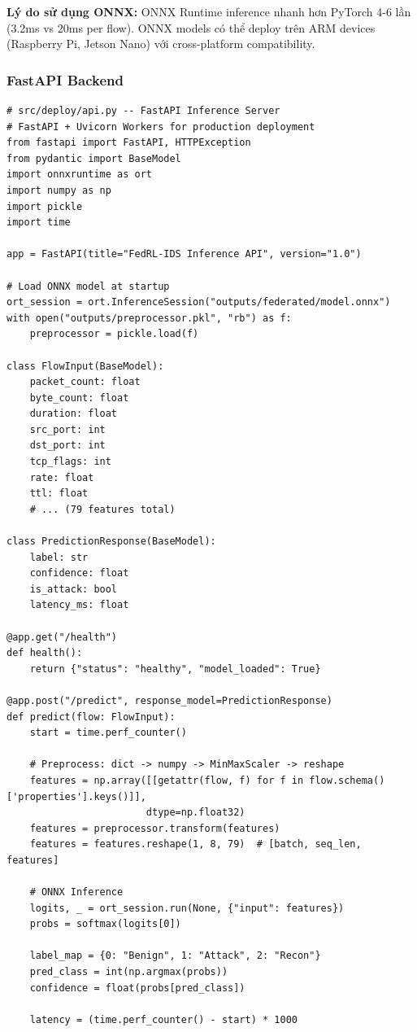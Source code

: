 \documentclass[12pt,a4paper]{article}
\begin{document}
\textbf{Lý do sử dụng ONNX:} ONNX Runtime inference nhanh hơn PyTorch 4-6 lần (3.2ms vs 20ms per flow). ONNX models có thể deploy trên ARM devices (Raspberry Pi, Jetson Nano) với cross-platform compatibility.

\subsubsection{FastAPI Backend}

\begin{lstlisting}[caption=FastAPI Backend, label=lst:fastapi]
# src/deploy/api.py -- FastAPI Inference Server
# FastAPI + Uvicorn Workers for production deployment
from fastapi import FastAPI, HTTPException
from pydantic import BaseModel
import onnxruntime as ort
import numpy as np
import pickle
import time

app = FastAPI(title="FedRL-IDS Inference API", version="1.0")

# Load ONNX model at startup
ort_session = ort.InferenceSession("outputs/federated/model.onnx")
with open("outputs/preprocessor.pkl", "rb") as f:
    preprocessor = pickle.load(f)

class FlowInput(BaseModel):
    packet_count: float
    byte_count: float
    duration: float
    src_port: int
    dst_port: int
    tcp_flags: int
    rate: float
    ttl: float
    # ... (79 features total)

class PredictionResponse(BaseModel):
    label: str
    confidence: float
    is_attack: bool
    latency_ms: float

@app.get("/health")
def health():
    return {"status": "healthy", "model_loaded": True}

@app.post("/predict", response_model=PredictionResponse)
def predict(flow: FlowInput):
    start = time.perf_counter()

    # Preprocess: dict -> numpy -> MinMaxScaler -> reshape
    features = np.array([[getattr(flow, f) for f in flow.schema()['properties'].keys()]],
                        dtype=np.float32)
    features = preprocessor.transform(features)
    features = features.reshape(1, 8, 79)  # [batch, seq_len, features]

    # ONNX Inference
    logits, _ = ort_session.run(None, {"input": features})
    probs = softmax(logits[0])

    label_map = {0: "Benign", 1: "Attack", 2: "Recon"}
    pred_class = int(np.argmax(probs))
    confidence = float(probs[pred_class])

    latency = (time.perf_counter() - start) * 1000


\end{lstlisting}
\end{document}
